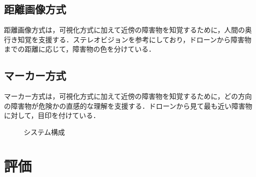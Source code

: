 \documentclass[a4paper,10pt,twocolumn,upLatex]{jsarticle}
\begin{document}
\subsection{距離画像方式}
距離画像方式は，可視化方式に加えて近傍の障害物を知覚するために，人間の奥行き知覚を支援する．ステレオビジョンを参考にしており，ドローンから障害物までの距離に応じて，障害物の色を分けている．

\subsection{マーカー方式}
マーカー方式は，可視化方式に加えて近傍の障害物を知覚するために，どの方向の障害物が危険かの直感的な理解を支援する．ドローンから見て最も近い障害物に対して，目印を付けている．


\begin{figure}[tb]
\begin{center}
  \vspace{-2mm}
  \caption{システム構成}
  \label{fig:overview}
\end{center}
\end{figure}

\section{評価}\label{experiment}
\end{document}

